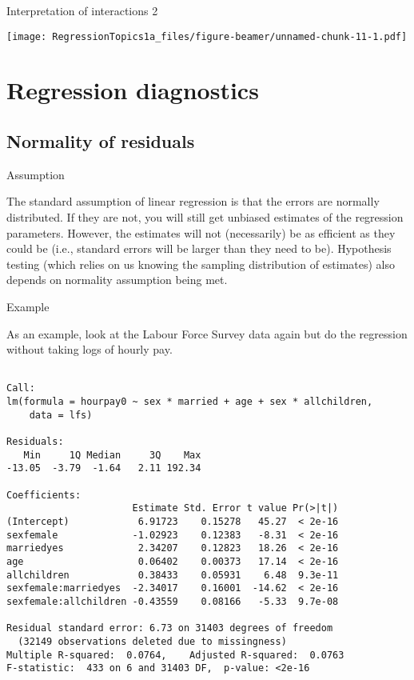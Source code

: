 \documentclass[10pt,ignorenonframetext,]{beamer}
\begin{document}
\begin{frame}{Interpretation of interactions 2}

\texttt{[image: RegressionTopics1a\_files/figure-beamer/unnamed-chunk-11-1.pdf]}

\end{frame}

\section{Regression diagnostics}\label{regression-diagnostics}

\subsection{Normality of residuals}\label{normality-of-residuals}

\begin{frame}{Assumption}

The standard assumption of linear regression is that the errors are
normally distributed. If they are not, you will still get unbiased
estimates of the regression parameters. However, the estimates will not
(necessarily) be as efficient as they could be (i.e., standard errors
will be larger than they need to be). Hypothesis testing (which relies
on us knowing the sampling distribution of estimates) also depends on
normality assumption being met.

\end{frame}

\begin{frame}[fragile]{Example}

As an example, look at the Labour Force Survey data again but do the
regression without taking logs of hourly pay.

\scriptsize

\begin{verbatim}

Call:
lm(formula = hourpay0 ~ sex * married + age + sex * allchildren,
    data = lfs)

Residuals:
   Min     1Q Median     3Q    Max
-13.05  -3.79  -1.64   2.11 192.34

Coefficients:
                      Estimate Std. Error t value Pr(>|t|)
(Intercept)            6.91723    0.15278   45.27  < 2e-16
sexfemale             -1.02923    0.12383   -8.31  < 2e-16
marriedyes             2.34207    0.12823   18.26  < 2e-16
age                    0.06402    0.00373   17.14  < 2e-16
allchildren            0.38433    0.05931    6.48  9.3e-11
sexfemale:marriedyes  -2.34017    0.16001  -14.62  < 2e-16
sexfemale:allchildren -0.43559    0.08166   -5.33  9.7e-08

Residual standard error: 6.73 on 31403 degrees of freedom
  (32149 observations deleted due to missingness)
Multiple R-squared:  0.0764,    Adjusted R-squared:  0.0763
F-statistic:  433 on 6 and 31403 DF,  p-value: <2e-16
\end{verbatim}

\end{frame}
\end{document}
